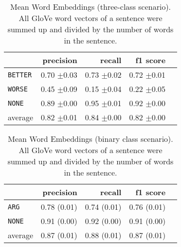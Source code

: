 	\begin{table}[h] 
		\centering 
		\caption{Mean Word Embeddings (three-class scenario). All GloVe word vectors of a sentence were summed up and divided by the number of words in the sentence.} 
		\label{  }
		\begin{tabular}{@{}lrrrr@{}}
			\toprule
			        & precision                & recall                   & f1 score                 \\ \midrule 
\texttt	{BETTER}	&	 0.70 \scriptsize{$\pm$0.03} &	 0.73 \scriptsize{$\pm$0.02} &	 0.72 \scriptsize{$\pm$0.01}  \\ 
\texttt	{WORSE}	&	 0.45 \scriptsize{$\pm$0.09} &	 0.15 \scriptsize{$\pm$0.04} &	 0.22 \scriptsize{$\pm$0.05}  \\ 
\texttt	{NONE}	&	 0.89 \scriptsize{$\pm$0.00} &	 0.95 \scriptsize{$\pm$0.01} &	 0.92 \scriptsize{$\pm$0.00}  \\ 
average	&	 0.82 \scriptsize{$\pm$0.01} &	 0.84 \scriptsize{$\pm$0.00} &	 0.82 \scriptsize{$\pm$0.00}  \\ 
			\bottomrule
		\end{tabular}
	\end{table}
	
	\begin{table}[h] 
		\centering 
		\caption{Mean Word Embeddings (binary class scenario). All GloVe word vectors of a sentence were summed up and divided by the number of words in the sentence.} 
		\label{  }
		\begin{tabular}{@{}lrrrr@{}}
			\toprule
			        & precision                & recall                   & f1 score                 \\ \midrule 
			\texttt{ARG}     & 0.78 \scriptsize{(0.01)} & 0.74 \scriptsize{(0.01)} & 0.76 \scriptsize{(0.01)} \\ 
			\texttt{NONE}    & 0.91 \scriptsize{(0.00)} & 0.92 \scriptsize{(0.00)} & 0.91 \scriptsize{(0.00)} \\ 
			average & 0.87 \scriptsize{(0.01)} & 0.88 \scriptsize{(0.01)} & 0.87 \scriptsize{(0.01)} \\ 
			\bottomrule
		\end{tabular}
	\end{table}
	
